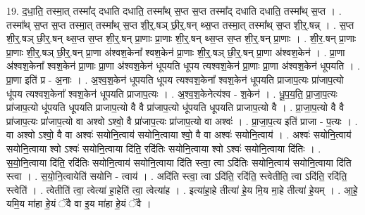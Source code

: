 \documentclass[17pt]{extarticle}
\begin{document}
19. द॒धा॒ति॒ तस्मा॒त् तस्मा᳚द् दधाति दधाति॒ तस्मा᳚थ् स॒प्त स॒प्त तस्मा᳚द् दधाति दधाति॒ तस्मा᳚थ् स॒प्त । . तस्मा᳚थ् स॒प्त स॒प्त तस्मा॒त् तस्मा᳚थ् स॒प्त शी॒र्॒.षञ् छी॒र्॒.षन् थ्स॒प्त तस्मा॒त् तस्मा᳚थ् स॒प्त शी॒र्॒.षन्न् । . स॒प्त शी॒र्॒.षञ् छी॒र्॒.षन् थ्स॒प्त स॒प्त शी॒र्॒.षन् प्रा॒णाः प्रा॒णाः शी॒र्॒.षन् थ्स॒प्त स॒प्त शी॒र्॒.षन् प्रा॒णाः । . शी॒र॒.षन् प्रा॒णाः प्रा॒णाः शी॒र्॒.षञ् छी॒र्॒.षन् प्रा॒णा अ॑श्वश॒केना᳚ श्वश॒केन॑ प्रा॒णाः शी॒र्॒.षञ् छी॒र्॒.षन् प्रा॒णा अ॑श्वश॒केन॑ । . प्रा॒णा अ॑श्वश॒केना᳚ श्वश॒केन॑ प्रा॒णाः प्रा॒णा अ॑श्वश॒केन॑ धूपयति धूपय त्यश्वश॒केन॑ प्रा॒णाः प्रा॒णा अ॑श्वश॒केन॑ धूपयति । . प्रा॒णा इति॑ प्र - अ॒नाः । . अ॒श्व॒श॒केन॑ धूपयति धूपय त्यश्वश॒केना᳚ श्वश॒केन॑ धूपयति प्राजाप॒त्यः प्रा॑जाप॒त्यो धू॑पय त्यश्वश॒केना᳚ श्वश॒केन॑ धूपयति प्राजाप॒त्यः । . अ॒श्व॒श॒केनेत्य॑श्व - श॒केन॑ । . धू॒प॒य॒ति॒ प्रा॒जा॒प॒त्यः प्रा॑जाप॒त्यो धू॑पयति धूपयति प्राजाप॒त्यो वै वै प्रा॑जाप॒त्यो धू॑पयति धूपयति प्राजाप॒त्यो वै । . प्रा॒जा॒प॒त्यो वै वै प्रा॑जाप॒त्यः प्रा॑जाप॒त्यो वा अश्वो ऽश्वो॒ वै प्रा॑जाप॒त्यः प्रा॑जाप॒त्यो वा अश्वः॑ । . प्रा॒जा॒प॒त्य इति॑ प्राजा - प॒त्यः । . वा अश्वो ऽश्वो॒ वै वा अश्वः॑ सयोनि॒त्वाय॑ सयोनि॒त्वाया श्वो॒ वै वा अश्वः॑ सयोनि॒त्वाय॑ । . अश्वः॑ सयोनि॒त्वाय॑ सयोनि॒त्वाया श्वो ऽश्वः॑ सयोनि॒त्वाया दि॑ति॒ रदि॑तिः सयोनि॒त्वाया श्वो ऽश्वः॑ सयोनि॒त्वाया दि॑तिः । . स॒यो॒नि॒त्वाया दि॑ति॒ रदि॑तिः सयोनि॒त्वाय॑ सयोनि॒त्वाया दि॑ति स्त्वा॒ त्वा ऽदि॑तिः सयोनि॒त्वाय॑ सयोनि॒त्वाया दि॑ति स्त्वा । . स॒यो॒नि॒त्वायेति॑ सयोनि - त्वाय॑ । . अदि॑ति स्त्वा॒ त्वा ऽदि॑ति॒ रदि॑ति॒ स्त्वेतीति॒ त्वा ऽदि॑ति॒ रदि॑ति॒ स्त्वेति॑ । . त्वेतीति॑ त्वा॒ त्वेत्या॑ हा॒हेति॑ त्वा॒ त्वेत्या॑ह । . इत्या॑हा॒हे तीत्या॑ हे॒य मि॒य मा॒हे तीत्या॑ हे॒यम् । . आ॒हे॒ यमि॒य मा॑हा हे॒यं ॅवै वा इ॒य मा॑हा हे॒यं ॅवै । \newline
\end{document}
